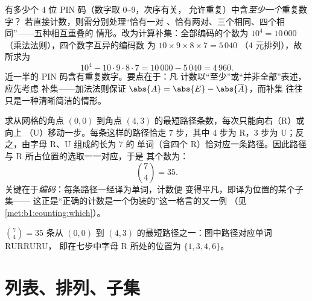 \begin{example}[补集计数]\label{ex:b1:counting:complement}
有多少个 $4$ 位 PIN 码（数字取 $0$--$9$，次序有关，
允许重复）中含\emph{至少一个}重复数字？
若直接计数，则需分别处理“恰有一对
、恰有两对、三个相同、四个相同”——五种相互重叠的
情形。改为计算补集：全部编码的个数为
$10^4 = 10\,000$（乘法法则），四个数字互异的编码数
为 $10 \times 9 \times 8 \times 7 = 5\,040$
（$4$ 元排列），故所求为
\[
10^4 - 10 \cdot 9 \cdot 8 \cdot 7 = 10\,000 - 5\,040 = 4\,960 .
\]
近一半的 PIN 码含有重复数字。要点在于：凡
计数以“至少”或“并非全部”表述，应先考虑
补集——加法法则保证
$\abs{A} = \abs{E} - \abs{\overline A}$，而补集
往往只是一种清晰简洁的情形。
\end{example}

\begin{example}[格路]\label{ex:b1:counting:paths}
求从网格的角点 $(0,0)$ 到角点
$(4, 3)$ 的最短路径条数，每次只能向右（R）或向上
（U）移动一步。每条这样的路径恰走 $7$ 步，其中
$4$ 步为 R，$3$ 步为 U；反之，由字母 R、U 组成的长为 $7$ 的
单词（含四个 R）恰对应一条路径。因此路径
与 R 所占位置的选取一一对应，于是
其个数为：
\[
\binom{7}{4} = 35 .
\]
关键在于\emph{编码}：每条路径一经译为单词，计数便
变得平凡，即译为位置的某个子集——
这正是“正确的计数是一个伪装的”这一格言的又一例
（见\cref{met:b1:counting:which}）。
\end{example}

\begin{omfigure}

{\small $\binom74 = 35$ 条从 $(0,0)$ 到
$(4,3)$ 的最短路径之一：图中路径对应单词 RURRURU，
即在七步中字母 R 所处的位置为
$\{1,3,4,6\}$。}
\end{omfigure}

\section{列表、排列、子集}

